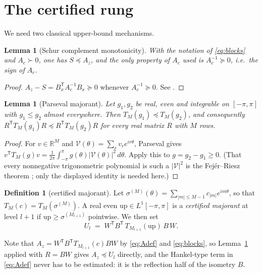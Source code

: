 \documentclass[11pt,a4paper]{article}
\theoremstyle{plain}
\newtheorem{lemma}[theorem]{Lemma}
\theoremstyle{definition}
\newtheorem{definition}[theorem]{Definition}
\newcommand{\R}{\mathbb{R}}
\newcommand{\T}{\mathsf{T}}
\newcommand{\Tm}[1]{T_{#1}}
\newcommand{\PSD}{\succeq 0}
\newcommand{\PD}{\succ 0}
\begin{document}
\section{The certified rung}
\label{sec:main}

We need two classical upper-bound mechanisms.

\begin{lemma}[Schur complement monotonicity]
\label{lem:haynsworth}
With the notation of \eqref{eq:blocks} and $A_{c}\PD$, one has $S\preceq A_{z}$, and
the only property of $A_{c}$ used is $A_{c}^{-1}\PSD$, i.e.\ the \emph{sign} of
$A_{c}$.
\end{lemma}

\begin{proof}
$A_{z}-S=B_{x}^{\T}A_{c}^{-1}B_{x}\PSD$ whenever $A_{c}^{-1}\PSD$. See
\cite{Haynsworth1968}.
\end{proof}

\begin{lemma}[Parseval majorant]
\label{lem:parseval}
Let $g_{1},g_{2}$ be real, even and integrable on $[-\pi,\pi]$ with
$g_{1}\le g_{2}$ almost everywhere. Then $\Tm{M}(g_{1})\preceq \Tm{M}(g_{2})$, and
consequently $R^{\T}\Tm{M}(g_{1})R\preceq R^{\T}\Tm{M}(g_{2})R$ for every real
matrix $R$ with $M$ rows.
\end{lemma}

\begin{proof}
For $v\in\R^{M}$ and $\mathcal V(\theta)=\sum_{r}v_{r}e^{ir\theta}$, Parseval gives
$v^{\T}\Tm{M}(g)v=\frac1{2\pi}\int_{-\pi}^{\pi}g(\theta)|\mathcal V(\theta)|^{2}\,d\theta$.
Apply this to $g=g_{2}-g_{1}\ge0$. (That every nonnegative trigonometric polynomial
is such a $|\mathcal V|^{2}$ is the Fej\'er--Riesz theorem
\cite{Fejer1916,Riesz1916}; only the displayed identity is needed here.)
\end{proof}

\begin{definition}[certified majorant]
\label{def:majorant}
Let $\sigma^{(M)}(\theta)=\sum_{|m|\le M-1}c_{|m|}e^{im\theta}$, so that
$\Tm{M}(c)=\Tm{M}(\sigma^{(M)})$. A real even
$\mathrm{up}\in L^{1}[-\pi,\pi]$ is a \emph{certified majorant} at level $l+1$ if
$\mathrm{up}\ge\sigma^{(M_{l+1})}$ pointwise. We then set
\begin{equation}
\label{eq:U}
  U_{l} \;=\; W^{\T}B^{\T}\,\Tm{M_{l+1}}(\mathrm{up})\,B\,W .
\end{equation}
\end{definition}

Note that $A_{z}=W^{\T}B^{\T}\Tm{M_{l+1}}(c)BW$ by \eqref{eq:Adef} and
\eqref{eq:blocks}, so Lemma~\ref{lem:parseval} applied with $R=BW$ gives
$A_{z}\preceq U_{l}$ directly, and the Hankel-type term in \eqref{eq:Adef} never has
to be estimated: it is the reflection half of the isometry $B$.
\end{document}
